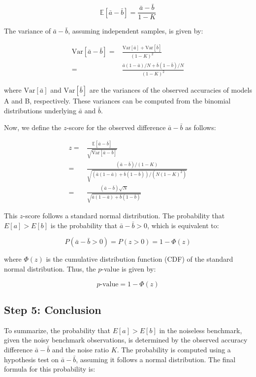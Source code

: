 \[
\mathbb{E}[\bar{a} - \bar{b}] = \frac{\bar{a} - \bar{b}}{1 - K}
\]

The variance of \( \bar{a} - \bar{b} \), assuming independent samples, is given by:

\begin{equation}
\begin{split}
\text{Var}[\bar{a} - \bar{b}] =& \frac{\text{Var}[\bar{a}] + \text{Var}[\bar{b}]}{(1 - K)^2} \\
=&\frac{\bar{a}(1-\bar{a})/N +\bar{b}(1-\bar{b})/N}{(1 - K)^2}
\end{split}
\end{equation}

where \( \text{Var}[\bar{a}] \) and \( \text{Var}[\bar{b}] \) are the variances of the observed accuracies of models A and B, respectively. These variances can be computed from the binomial distributions underlying \( \bar{a} \) and \( \bar{b} \).

Now, we define the \( z \)-score for the observed difference \( \bar{a} - \bar{b} \) as follows:

\begin{equation}
\begin{split}
z =& \frac{\mathbb{E}[\bar{a} - \bar{b}]}{\sqrt{\text{Var}[\bar{a} - \bar{b}]}}\\
=&\frac{(\bar{a} - \bar{b})/(1-K)}{\sqrt{(\bar{a}(1-\bar{a}) + \bar{b}(1-\bar{b}))/(N(1-K)^2)}} \\
=&\frac{(\bar{a} - \bar{b})\sqrt{N}}{\sqrt{\bar{a}(1-\bar{a}) + \bar{b}(1-\bar{b})}}
\end{split}
\end{equation}

This \( z \)-score follows a standard normal distribution. The probability that \( E[a] > E[b] \) is the probability that \( \bar{a} - \bar{b} > 0 \), which is equivalent to:

\[
P(\bar{a} - \bar{b} > 0) = P(z > 0) = 1 - \Phi(z)
\]

where \( \Phi(z) \) is the cumulative distribution function (CDF) of the standard normal distribution. Thus, the \( p \)-value is given by:

\[
p\text{-value} = 1 - \Phi(z)
\]

\subsection*{Step 5: Conclusion}

To summarize, the probability that \( E[a] > E[b] \) in the noiseless benchmark, given the noisy benchmark observations, is determined by the observed accuracy difference \( \bar{a} - \bar{b} \) and the noise ratio \( K \). The probability is computed using a hypothesis test on \( \bar{a} - \bar{b} \), assuming it follows a normal distribution. The final formula for this probability is:

